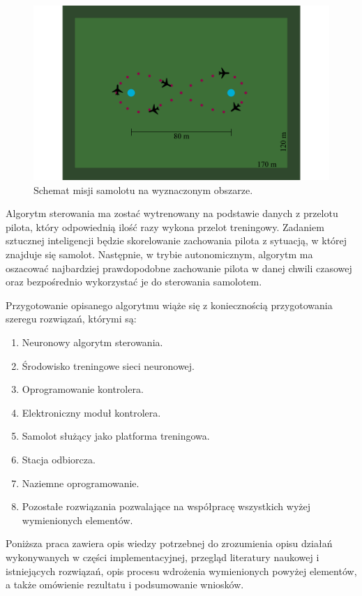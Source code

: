 \documentclass[12pt, a4paper]{article}
\begin{document}
\begin{figure}[ht]
    \centering
    \includegraphics[width=1\textwidth]{osemka}
    \caption{Schemat misji samolotu na wyznaczonym obszarze.}
    \label{fig:osemka}
\end{figure}

Algorytm sterowania ma zostać wytrenowany na podstawie danych z przelotu pilota, który odpowiednią ilość razy wykona przelot treningowy. Zadaniem sztucznej inteligencji będzie skorelowanie zachowania pilota z sytuacją, w której znajduje się samolot. Następnie, w trybie autonomicznym, algorytm ma oszacować najbardziej prawdopodobne zachowanie pilota w danej chwili czasowej oraz bezpośrednio wykorzystać je do sterowania samolotem. 

Przygotowanie opisanego algorytmu wiąże się z koniecznością przygotowania szeregu rozwiązań, którymi są:
\begin{enumerate}
	\item Neuronowy algorytm sterowania.
	\item Środowisko treningowe sieci neuronowej.
	\item Oprogramowanie kontrolera.
	\item Elektroniczny moduł kontrolera.
	\item Samolot służący jako platforma treningowa.
	\item Stacja odbiorcza.
	\item Naziemne oprogramowanie.
	\item Pozostałe rozwiązania pozwalające na współpracę wszystkich wyżej wymienionych elementów.
\end{enumerate}

Poniższa praca zawiera opis wiedzy potrzebnej do zrozumienia opisu działań wykonywanych w części implementacyjnej, przegląd literatury naukowej i istniejących rozwiązań, opis procesu wdrożenia wymienionych powyżej elementów, a także omówienie rezultatu i podsumowanie wniosków.
\end{document}
